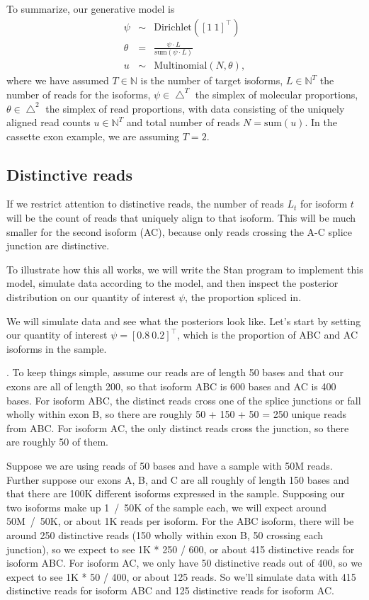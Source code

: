 \documentclass[11pt]{report}
\newcommand{\vect}[1]{[#1]^{\top}}
\newcommand{\rdistro}[2]{\textrm{#1}\!\left( #2 \right)}
\begin{document}
To summarize, our generative model is
\begin{eqnarray*}
  \psi & \sim & \rdistro{Dirichlet}{[1 \ 1]^{\top}}
  \\[4pt]
  \theta & = & \frac{\displaystyle \psi \cdot L}
               {\displaystyle \textrm{sum}(\psi \cdot L)}
  \\[4pt]
  u & \sim & \rdistro{Multinomial}{N, \theta},
\end{eqnarray*}
where we have assumed $T \in \mathbb{N}$ is the number of target
isoforms, $L \in \mathbb{N}^T$ the number of reads for the isoforms,
$\psi \in \bigtriangleup^T$ the simplex of molecular proportions,
$\theta \in \bigtriangleup^2$ the simplex of read proportions, with
data consisting of the uniquely aligned read counts
$u \in \mathbb{N}^T$ and total number of reads $N = \textrm{sum}(u)$.
In the cassette exon example, we are assuming $T = 2$.


\subsection{Distinctive reads}

If we restrict attention to distinctive reads, the number of reads
$L_t$ for isoform $t$ will be the count of reads that uniquely align
to that isoform.  This will be much smaller for the second isoform
(AC), because only reads crossing the A-C splice junction are
distinctive.  

To illustrate how this all works, we will write the Stan program to
implement this model, simulate data according to the model, and then
inspect the posterior distribution on our quantity of interest $\psi$,
the proportion spliced in.

We will simulate data and see what the posteriors look like.  Let's
start by setting our quantity of interest $\psi = \vect{0.8 \ 0.2}$,
which is the proportion of ABC and AC isoforms in the sample.

.
To keep things simple, assume our reads are of length 50 bases and
that our exons are all of length 200, so that isoform ABC is 600 bases
and AC is 400 bases.  For isoform ABC, the distinct reads cross one of
the splice junctions or fall wholly within exon B, so there are
roughly 50 + 150 + 50 = 250 unique reads from ABC.  For isoform AC,
the only distinct reads cross the junction, so there are roughly 50 of
them.


Suppose
we are using reads of 50 bases and have a sample with 50M reads.
Further suppose our exons A, B, and C are all roughly of length 150
bases and that there are 100K different isoforms expressed in the
sample.  Supposing our two isoforms make up 1~/~50K of the sample
each, we will expect around 50M~/~50K, or about 1K reads per isoform.
For the ABC isoform, there will be around 250 distinctive reads (150
wholly within exon B, 50 crossing each junction), so we expect to see
1K * 250 / 600, or about 415 distinctive reads for isoform ABC.  For
isoform AC, we only have 50 distinctive reads out of 400, so we expect
to see 1K * 50 / 400, or about 125 reads.  So we'll simulate data with
415 distinctive reads for isoform ABC and 125 distinctive reads for
isoform AC.
\end{document}
